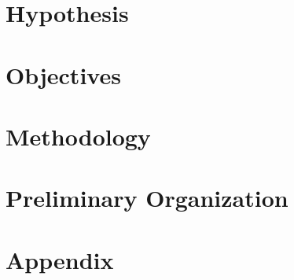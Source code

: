 \documentclass[11pt,usenames,dvipsnames]{article} %
\begin{document}
\section{Hypothesis} \label{sec:hypothesis}


\section{Objectives} \label{sec:objectives}


\section{Methodology} \label{sec:methodology}


\section{Preliminary Organization} \label{sec:organization}
{\footnotesize
	
}

%

\newpage
\nocite{*}
{\footnotesize

 \label{sec:bibliography}
}

\newpage
\section*{Appendix}  \label{sec:appendices}
\begin{appendices}
	
\end{appendices}

\end{document}
